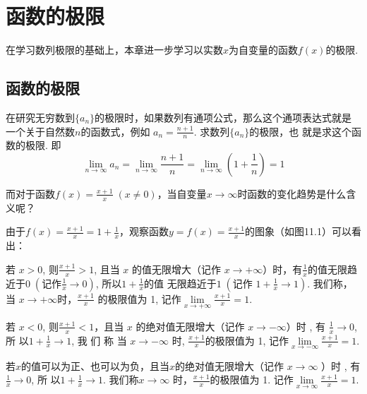 \chapter{函数的极限}


在学习数列极限的基础上，本章进一步学习以实数$x$为自变量的函数$f(x)$的极限.

\section{函数的极限}
在研究无穷数到$\{a_n\}$的极限时，如果数列有通项公式，那么这个通项表达式就是一个关于自然数$n$的函数式，例如
$a_n=\frac{n+1}{n}$. 求数列$\{a_n\}$的极限，也
就是求这个函数的极限. 即
\[\lim_{n\to\infty}a_n = \lim_{n\to\infty}\frac{n+1}{n}=\lim_{n\to\infty}\left(1+\frac{1}{n}\right)=1\]

而对于函数$f(x)=\frac{x+1}{x}\; (x\ne 0)$，当自变量$x\to \infty$时函数的变化趋势是什么含义呢？

由于$f(x)=\frac{x+1}{x}=1+\frac{1}{x}$，观察函数$y=f(x)=\frac{x+1}{x}$的图象（如图11.1）可以看出：
\begin{figure}[htp]
    \centering
{}
    \caption{}
\end{figure}



若 $x>0$, 则$\frac{x+1}x>1$, 且当 $x$ 的值无限增大（记作 $x\to+\infty$）时，有$\frac{1}{x}$的值无限趋近于$0\; \left(\text{记作}\frac{1}{x}\to 0\right)$, 所以$1+\frac{1}{x}$的值
无限趋近于$1\; \left(\text{记作 }1+\frac1x\to1\right)$. 我们称，当 $x\to+\infty$时，$\frac{x+1}x$ 的极限值为 1, 记作$\lim\limits_{x\to+\infty}\frac{x+1}{x}=1$.

若 $x< 0$, 则$\frac{x+1}x<1$，且当 $x$ 的绝对值无限增大（记作 $x\to -\infty$）时 , 有 $\frac 1x\to 0$, 所 以$1+ \frac 1x\to 1$, 我 们 称 当 $x\to -\infty$ 时, $\frac{x+1}{x}$的极限值为 1, 记作$\lim\limits_{x\to-\infty}\frac{x+1}{x}=1$.

若$x$的值可以为正、也可以为负，且当$x$的绝对值无限增大（记作 $x\to \infty$ ）时 , 有$\frac 1x\to 0$, 所 以$1+ \frac 1x\to 1$. 我们称$x\to\infty$ 时，$\frac{x+1}x$的极限值为 1. 记作$\lim\limits_{x\to\infty}\frac{x+1}x=1$.

